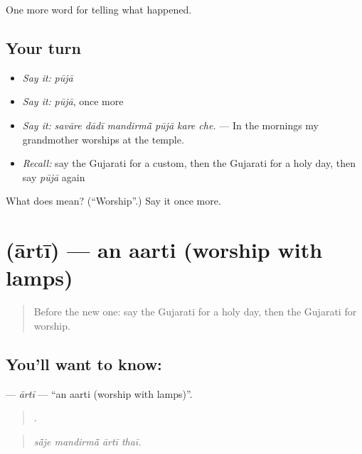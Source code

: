 \begin{grammarlens}[title={What you've built}]
One more word for telling what happened.
\end{grammarlens}

\subsection*{Your turn}
\begin{itemize}
\raggedright
  \item \emph{Say it:} \emph{pūjā}
  \item \emph{Say it:} \emph{pūjā}, once more
  \item \emph{Say it:} \emph{savāre dādī mandirmā̃ pūjā kare che.} — In the mornings my grandmother worships at the temple.
  \item \emph{Recall:} say the Gujarati for a custom, then the Gujarati for a holy day, then say \emph{pūjā} again
\end{itemize}

\begin{tcolorbox}[breakable,colback=teal!4,colframe=teal!35!black,title={Before you move on}]
What does  mean? (\textquotedblleft{}Worship\textquotedblright{}.) Say it once more.
\end{tcolorbox}
\section[\texorpdfstring{\gu{આરતી} (ārtī)}{આરતી (ārtī)}]{ (ārtī) — an aarti (worship with lamps)}

\label{lesson:GU-C328-arti}



\begin{quote}
Before the new one: say the Gujarati for a holy day, then the Gujarati for worship.
\end{quote}

\subsection*{You'll want to know: }
\textbf{} — \emph{ārtī} — \textquotedblleft{}an aarti (worship with lamps)\textquotedblright{}.

\begin{quote}
   .
\end{quote}

\begin{quote}
\emph{sā̃je mandirmā̃ ārtī thaī.}
\end{quote}

